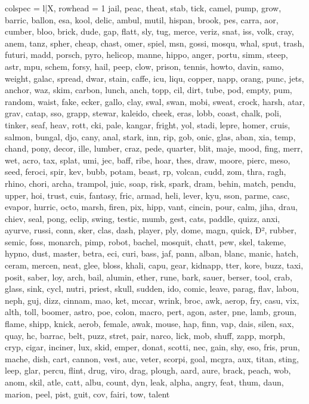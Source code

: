 \begin{tblr}[
  long,
  caption = {Examples from SNLI.},
  entry = {Short Caption},
  label = {tblr:test},
]{
colspec = {l|X},
rowhead = 1}
jail, peac, theat, stab, tick, camel, pump, grow, barric, ballon, esa, kool, delic, ambul, mutil, hispan, brook, pes, carra, aor, cumber, bloo, brick, dude, gap, flatt, sly, tug, merce, veriz, snat, iss, volk, cray, anem, tanz, spher, cheap, chast, omer, spiel, msn, gossi, mosqu, whal, sput, trash, futuri, madd, porsch, pyro, helicop, manne, hippo, anger, portu, simm, steep, astr, mpu, schem, forsy, hail, peep, clow, prison, tennis, howto, davin, samo, weight, galac, spread, dwar, stain, caffe, icu, liqu, copper, napp, orang, punc, jets, anchor, waz, skim, carbon, lunch, anch, topp, cil, dirt, tube, pod, empty, pum, random, waist, fake, ecker, gallo, clay, swal, swan, mobi, sweat, crock, harsh, atar, grav, catap, sso, grapp, stewar, kaleido, cheek, eras, lobb, coast, chalk, poli, tinker, seaf, heav, rott, cki, pale, kangar, fright, yol, stadi, lepre, homer, cruis, salmon, bungal, djo, cany, anal, stark, inn, rip, gob, onic, glas, aban, xia, temp, chand, pony, decor, ille, lumber, craz, pede, quarter, blit, maje, mood, fing, merr, wet, acro, tax, splat, umi, jec, baff, ribe, hoar, thes, draw, moore, pierc, meso, seed, feroci, spir, kev, bubb, potam, beast, rp, volcan, cudd, zom, thra, ragh, rhino, chori, archa, trampol, juic, soap, risk, spark, dram, behin, match, pendu, upper, hoi, trust, cuis, fantasy, fric, armad, heli, lever, kyu, sson, parme, casc, evapor, hurric, octo, marsh, firen, pix, hipp, vant, cincin, pour, calm, jiha, drau, chiev, seal, pong, eclip, swing, testic, mumb, gest, cats, paddle, quizz, anxi, ayurve, russi, conn, sker, clas, dash, player, ply, dome, magn, quick, Ð², rubber, semic, foss, monarch, pimp, robot, bachel, mosquit, chatt, pew, skel, takeme, hypno, dust, master, betra, eci, curi, bass, jaf, pann, alban, blanc, manic, hatch, ceram, mercen, neat, glee, bloss, khali, capu, gear, kidnapp, tter, kore, buzz, taxi, posit, saber, loy, arch, bail, alumin, ether, rune, bark, sauer, berser, tool, crab, glass, sink, cycl, nutri, priest, skull, sudden, ido, comic, leave, parag, flav, labou, neph, guj, dizz, cinnam, mao, ket, mccar, wrink, broc, awk, aerop, fry, casu, vix, alth, toll, boomer, astro, poe, colon, macro, pert, agon, aster, pne, lamb, groun, flame, shipp, knick, aerob, female, awak, mouse, hap, finn, vap, dais, silen, sax, quay, hc, barrac, belt, puzz, stret, pair, narco, lick, mob, shuff, zapp, morph, cryp, cigar, inciner, lux, skid, emper, donat, scotti, nec, gain, shy, eso, fris, prun, mache, dish, cart, cannon, vest, auc, veter, scorpi, goal, mcgra, aux, titan, sting, leep, glar, percu, flint, drug, viro, drag, plough, aard, aure, brack, peach, wob, anom, skil, atle, catt, albu, count, dyn, leak, alpha, angry, feat, thum, daun, marion, peel, pist, guit, cov, fairi, tow, talent \\\midrule

\end{tblr}
